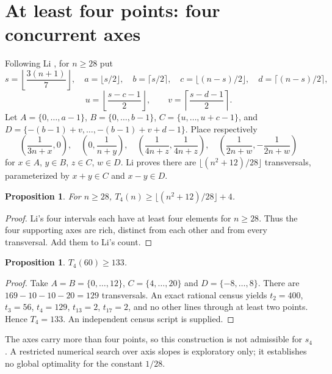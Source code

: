 \documentclass[11pt,a4paper]{amsart}
\newtheorem{proposition}[theorem]{Proposition}
\theoremstyle{remark}\newtheorem{remark}[theorem]{Remark}
\begin{document}
\section{At least four points: four concurrent axes}\label{sec:axes}
Following Li \cite{Li}, for $n\ge28$ put
\[
s=\left\lfloor\frac{3(n+1)}7\right\rfloor,\quad a=\lfloor s/2\rfloor,\quad b=\lceil s/2\rceil,\quad c=\lfloor(n-s)/2\rfloor,\quad d=\lceil(n-s)/2\rceil,
\]
\[
u=\left\lfloor\frac{s-c-1}2\right\rfloor,\qquad v=\left\lceil\frac{s-d-1}2\right\rceil.
\]
Let $A=\{0,\ldots,a-1\}$, $B=\{0,\ldots,b-1\}$, $C=\{u,\ldots,u+c-1\}$, and $D=\{-(b-1)+v,\ldots,-(b-1)+v+d-1\}$. Place respectively
\[
\left(\frac1{3n+x},0\right),\quad \left(0,\frac1{n+y}\right),\quad
\left(\frac1{4n+z},\frac1{4n+z}\right),\quad
\left(\frac1{2n+w},-\frac1{2n+w}\right)
\]
for $x\in A$, $y\in B$, $z\in C$, $w\in D$. Li proves there are $\lfloor(n^2+12)/28\rfloor$ transversals, parameterized by $x+y\in C$ and $x-y\in D$.
\begin{proposition}\label{prop:li}
For $n\ge28$, $T_4(n)\ge\lfloor(n^2+12)/28\rfloor+4$.
\end{proposition}
\begin{proof}
Li's four intervals each have at least four elements for $n\ge28$. Thus the four supporting axes are rich, distinct from each other and from every transversal. Add them to Li's count.
\end{proof}
\begin{proposition}\label{prop:60}
$T_4(60)\ge133$.
\end{proposition}
\begin{proof}
Take $A=B=\{0,\ldots,12\}$, $C=\{4,\ldots,20\}$ and $D=\{-8,\ldots,8\}$. There are $169-10-10-20=129$ transversals. An exact rational census yields $t_2=400$, $t_3=56$, $t_4=129$, $t_{13}=2$, $t_{17}=2$, and no other lines through at least two points. Hence $T_4=133$. An independent census script is supplied.
\end{proof}
The axes carry more than four points, so this construction is not admissible for $s_4$. A restricted numerical search over axis slopes is exploratory only; it establishes no global optimality for the constant $1/28$.
\end{document}

